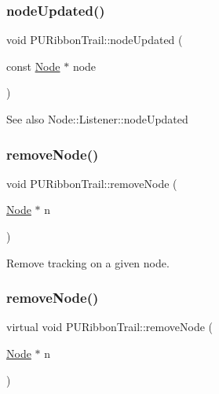 \subsubsection{\texorpdfstring{node\+Updated()}{nodeUpdated()}\hspace{0.1cm}{\footnotesize\ttfamily [2/2]}}
{\footnotesize\ttfamily void P\+U\+Ribbon\+Trail\+::node\+Updated (\begin{DoxyParamCaption}\item[{const \hyperlink{classNode}{Node} $\ast$}]{node }\end{DoxyParamCaption})}

\begin{DoxySeeAlso}{See also}
Node\+::\+Listener\+::node\+Updated 
\end{DoxySeeAlso}
\mbox{\label{classPURibbonTrail_abcb0fb34b7cda45a2180285d4903e4fc}} 
\subsubsection{\texorpdfstring{remove\+Node()}{removeNode()}\hspace{0.1cm}{\footnotesize\ttfamily [1/2]}}
{\footnotesize\ttfamily void P\+U\+Ribbon\+Trail\+::remove\+Node (\begin{DoxyParamCaption}\item[{\hyperlink{classNode}{Node} $\ast$}]{n }\end{DoxyParamCaption})\hspace{0.3cm}{\ttfamily [virtual]}}

Remove tracking on a given node. \mbox{\label{classPURibbonTrail_a0c3fce3ad7a234a09915afd9a0f7a3b8}} 
\subsubsection{\texorpdfstring{remove\+Node()}{removeNode()}\hspace{0.1cm}{\footnotesize\ttfamily [2/2]}}
{\footnotesize\ttfamily virtual void P\+U\+Ribbon\+Trail\+::remove\+Node (\begin{DoxyParamCaption}\item[{\hyperlink{classNode}{Node} $\ast$}]{n }\end{DoxyParamCaption})\hspace{0.3cm}{\ttfamily [virtual]}}

